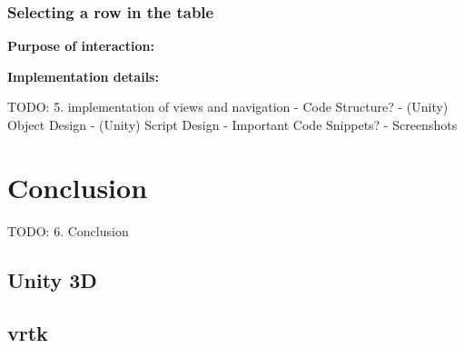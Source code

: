\subsubsection{Selecting a row in the table}

\textbf{Purpose of interaction:}

\textbf{Implementation details:}






TODO:
5. implementation of views and navigation
- Code Structure?
- (Unity) Object Design
- (Unity) Script Design
- Important Code Snippets?
- Screenshots







\section{Conclusion}


TODO:
6. Conclusion


\subsection{Unity 3D}


\subsection{\gls{vrtk}}




